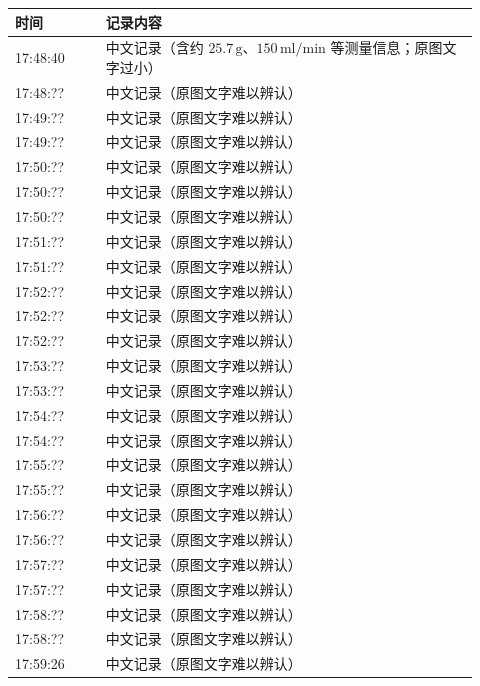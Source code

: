 \documentclass[UTF8,10pt,a4paper,fontset=fandol]{ctexart}
\begin{document}
\newpage


\begin{center}
\small
\begin{tabular}{p{0.18\linewidth}p{0.74\linewidth}}
\textbf{时间} & \textbf{记录内容} \\ \hline
17:48:40 & 中文记录（含约 $25.7\,\mathrm{g}$、$150\,\mathrm{ml/min}$ 等测量信息；原图文字过小）\\
17:48:?? & 中文记录（原图文字难以辨认）\\
17:49:?? & 中文记录（原图文字难以辨认）\\
17:49:?? & 中文记录（原图文字难以辨认）\\
17:50:?? & 中文记录（原图文字难以辨认）\\
17:50:?? & 中文记录（原图文字难以辨认）\\
17:50:?? & 中文记录（原图文字难以辨认）\\
17:51:?? & 中文记录（原图文字难以辨认）\\
17:51:?? & 中文记录（原图文字难以辨认）\\
17:52:?? & 中文记录（原图文字难以辨认）\\
17:52:?? & 中文记录（原图文字难以辨认）\\
17:52:?? & 中文记录（原图文字难以辨认）\\
17:53:?? & 中文记录（原图文字难以辨认）\\
17:53:?? & 中文记录（原图文字难以辨认）\\
17:54:?? & 中文记录（原图文字难以辨认）\\
17:54:?? & 中文记录（原图文字难以辨认）\\
17:55:?? & 中文记录（原图文字难以辨认）\\
17:55:?? & 中文记录（原图文字难以辨认）\\
17:56:?? & 中文记录（原图文字难以辨认）\\
17:56:?? & 中文记录（原图文字难以辨认）\\
17:57:?? & 中文记录（原图文字难以辨认）\\
17:57:?? & 中文记录（原图文字难以辨认）\\
17:58:?? & 中文记录（原图文字难以辨认）\\
17:58:?? & 中文记录（原图文字难以辨认）\\
17:59:26 & 中文记录（原图文字难以辨认）\\ \hline
\end{tabular}


\end{center}
\end{document}
